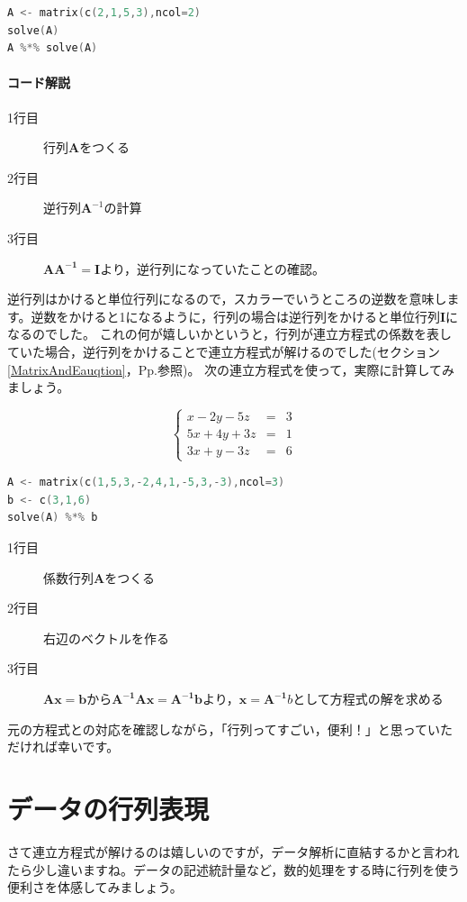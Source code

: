 \documentclass{ltjsbook}
\begin{document}
\begin{lstlisting}[language=c++,label={code:09_04},caption={逆行列の計算}]
A <- matrix(c(2,1,5,3),ncol=2)
solve(A)
A %*% solve(A)
\end{lstlisting}
\paragraph{コード解説}
\begin{description}
	\item[1行目] 行列$\bm{A}$をつくる
	\item[2行目] 逆行列$\bm{A}^{-1}$の計算
	\item[3行目] $\bm{AA^{-1}}=\bm{I}$より，逆行列になっていたことの確認。
\end{description}

逆行列はかけると単位行列になるので，スカラーでいうところの逆数を意味します。逆数をかけると1になるように，行列の場合は逆行列をかけると単位行列$\bm{I}$になるのでした。
これの何が嬉しいかというと，行列が連立方程式の係数を表していた場合，逆行列をかけることで連立方程式が解けるのでした(セクション\ref{MatrixAndEauqtion}，Pp.\pageref{MatrixAndEauqtion}参照)。
次の連立方程式を使って，実際に計算してみましょう。

\[
	\left \{
	\begin{array}{lcl}
		x-2y-5z  & = & 3 \\
		5x+4y+3z & = & 1 \\
		3x+y-3z  & = & 6
	\end{array}
	\right .
\]

\begin{lstlisting}[language=c++,label={code:09_05},caption={連立方程式を解く}]
A <- matrix(c(1,5,3,-2,4,1,-5,3,-3),ncol=3)
b <- c(3,1,6)
solve(A) %*% b
\end{lstlisting}
\begin{description}
	\item[1行目] 係数行列$\bm{A}$をつくる
	\item[2行目] 右辺のベクトルを作る
	\item[3行目] $\bm{Ax}=\bm{b}$から$\bm{A^{-1}Ax}=\bm{A^{-1}b}$より，$\bm{x}=\bm{A^{-1}}b$として方程式の解を求める
\end{description}

元の方程式との対応を確認しながら，「行列ってすごい，便利！」と思っていただければ幸いです。

\section{データの行列表現}
さて連立方程式が解けるのは嬉しいのですが，データ解析に直結するかと言われたら少し違いますね。データの記述統計量など，数的処理をする時に行列を使う便利さを体感してみましょう。
\end{document}
